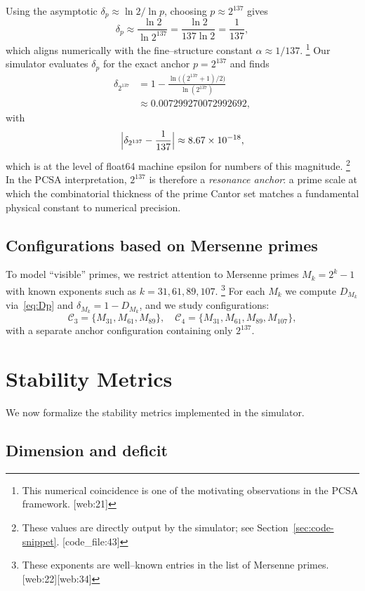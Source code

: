 \documentclass[11pt]{article}
\begin{document}
Using the asymptotic $\delta_p \approx \ln 2 / \ln p$, choosing $p \approx 2^{137}$ gives
\[
  \delta_p \approx \frac{\ln 2}{\ln 2^{137}} 
  = \frac{\ln 2}{137\ln 2} 
  = \frac{1}{137},
\]
which aligns numerically with the fine--structure constant $\alpha\approx 1/137$.%
\footnote{This numerical coincidence is one of the motivating observations in the PCSA framework. [web:21]} 
Our simulator evaluates $\delta_p$ for the exact anchor $p=2^{137}$ and finds
\begin{align}
  \delta_{2^{137}} 
    &= 1 - \frac{\ln\bigl((2^{137}+1)/2\bigr)}{\ln(2^{137})} \\
    &\approx 0.007299270072992692,
\end{align}
with 
\[
  \Bigl|\delta_{2^{137}} - \frac{1}{137}\Bigr| \approx 8.67\times 10^{-18},
\]
which is at the level of float64 machine epsilon for numbers of this magnitude.%
\footnote{These values are directly output by the simulator; see Section~\ref{sec:code-snippet}. [code\_file:43]} 
In the PCSA interpretation, $2^{137}$ is therefore a \emph{resonance anchor}: a prime scale at which the combinatorial thickness of the prime Cantor set matches a fundamental physical constant to numerical precision.

\subsection{Configurations based on Mersenne primes}

To model ``visible'' primes, we restrict attention to Mersenne primes $M_k = 2^k-1$ with known exponents such as $k=31,61,89,107$.%
\footnote{These exponents are well--known entries in the list of Mersenne primes. [web:22][web:34]} 
For each $M_k$ we compute $D_{M_k}$ via~\eqref{eq:Dp} and $\delta_{M_k}=1-D_{M_k}$, and we study configurations:
\[
  \mathcal{C}_3 = \{M_{31},M_{61},M_{89}\},\quad
  \mathcal{C}_4 = \{M_{31},M_{61},M_{89},M_{107}\},
\]
with a separate anchor configuration containing only $2^{137}$.%

\section{Stability Metrics}

We now formalize the stability metrics implemented in the simulator.

\subsection{Dimension and deficit}
\end{document}
